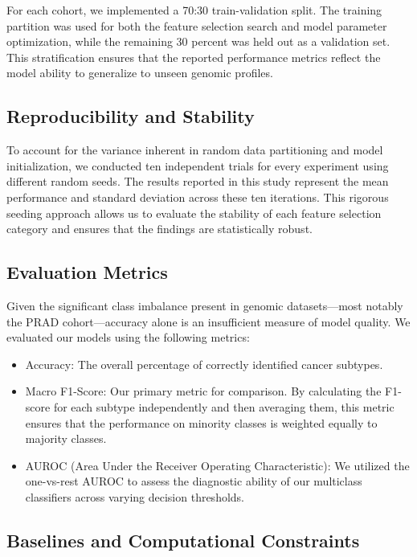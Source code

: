 \documentclass{article}
\begin{document}
For each cohort, we implemented a 70:30 train-validation split. The training partition was used for both the feature selection search and model parameter optimization, while the remaining 30 percent was held out as a validation set. This stratification ensures that the reported performance metrics reflect the model ability to generalize to unseen genomic profiles.

\subsection{Reproducibility and Stability}

To account for the variance inherent in random data partitioning and model initialization, we conducted ten independent trials for every experiment using different random seeds. The results reported in this study represent the mean performance and standard deviation across these ten iterations. This rigorous seeding approach allows us to evaluate the stability of each feature selection category and ensures that the findings are statistically robust.

\subsection{Evaluation Metrics}

Given the significant class imbalance present in genomic datasets—most notably the PRAD cohort—accuracy alone is an insufficient measure of model quality. We evaluated our models using the following metrics:

\begin{itemize}
    \item Accuracy: The overall percentage of correctly identified cancer subtypes.
    \item Macro F1-Score: Our primary metric for comparison. By calculating the F1-score for each subtype independently and then averaging them, this metric ensures that the performance on minority classes is weighted equally to majority classes.
    \item AUROC (Area Under the Receiver Operating Characteristic): We utilized the one-vs-rest AUROC to assess the diagnostic ability of our multiclass classifiers across varying decision thresholds.
\end{itemize}

\subsection{Baselines and Computational Constraints}
\end{document}
